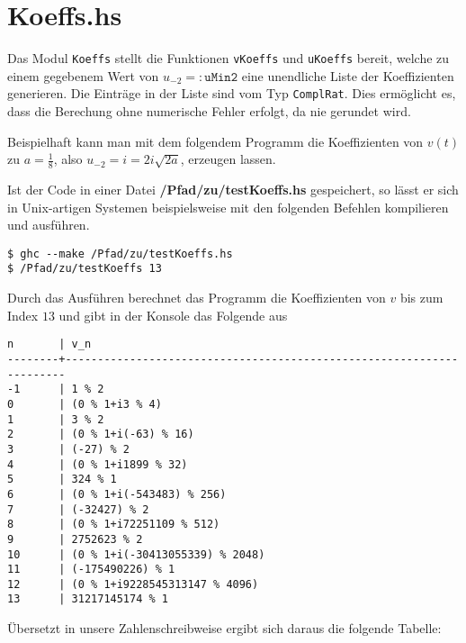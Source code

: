 \section{Koeffs.hs} \label{sec:Koeffs.hs}
Das Modul \texttt{Koeffs} stellt die Funktionen \texttt{vKoeffs} und
\texttt{uKoeffs} bereit, welche zu einem gegebenem Wert von
$u_{-2}=:\texttt{uMin2}$ eine
unendliche Liste der Koeffizienten generieren. Die Einträge in der Liste sind
vom Typ \texttt{ComplRat}.
Dies ermöglicht es, dass die Berechung ohne numerische Fehler erfolgt, da nie
gerundet wird.

Beispielhaft kann man mit dem folgendem Programm die Koeffizienten von $v(t)$
zu $a=\frac{1}{8}$, also $u_{-2}=i=2i\sqrt{2a}$, erzeugen lassen.

Ist der Code in einer Datei \textbf{/Pfad/zu/testKoeffs.hs} gespeichert, so
lässt er sich in Unix-artigen Systemen beispielsweise mit den folgenden
Befehlen kompilieren und ausführen.
\begin{lstlisting}[style=Bash]
$ ghc --make /Pfad/zu/testKoeffs.hs
$ /Pfad/zu/testKoeffs 13
\end{lstlisting}
Durch das Ausführen berechnet das Programm die Koeffizienten von $v$ bis zum
Index $13$ und gibt in der Konsole das Folgende aus
\begin{lstlisting}[style=Bash]
n       | v_n
--------+----------------------------------------------------------------------
-1      | 1 % 2
0       | (0 % 1+i3 % 4)
1       | 3 % 2
2       | (0 % 1+i(-63) % 16)
3       | (-27) % 2
4       | (0 % 1+i1899 % 32)
5       | 324 % 1
6       | (0 % 1+i(-543483) % 256)
7       | (-32427) % 2
8       | (0 % 1+i72251109 % 512)
9       | 2752623 % 2
10      | (0 % 1+i(-30413055339) % 2048)
11      | (-175490226) % 1
12      | (0 % 1+i9228545313147 % 4096)
13      | 31217145174 % 1
\end{lstlisting}
Übersetzt in unsere Zahlenschreibweise ergibt sich daraus die folgende Tabelle:
\renewcommand{\arraystretch}{1.4}

